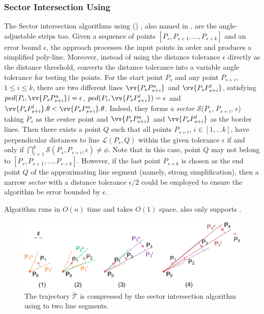 \subsubsection {Sector Intersection Using \ped}
\label{sec-siped}

The Sector intersection algorithms using \ped (\siped) \cite{Williams:Longest,Sklansky:Cone,Dunham:Cone}, also named \sleeve in \cite{Zhao:Sleeve}, are {the angle-adjustable strips too}.
Given a sequence of points $[P_{s}, P_{s+1}, \ldots, P_{s+k}]$ and an error bound $\epsilon$, the \siped approach processes the input points in order and produces a simplified poly-line.  Moreover, instead of using the distance tolerance $\epsilon$ directly as the distance threshold, \siped converts the distance tolerance into a variable angle tolerance for testing the points.
%
For the start point $P_s$ and any point $P_{s+i}$, $1\le i\le k$, there are two different lines $\vv{P_sP^u_{s+i}}$ and $\vv{P_sP^l_{s+i}}$, satisfying $ped(P_i, \vv{P_sP^u_{s+i}}) = \epsilon$, $ped(P_i, \vv{P_sP^l_{s+i}}) = \epsilon$ and $\vv{P_sP^l_{s+i}}.\theta < \vv{P_sP^u_{s+i}}.\theta$. Indeed, they forms a \emph{sector} $\mathcal{S}$($P_s$, $P_{s+i}$, $\epsilon$) taking $P_s$ as the center point and $\vv{P_sP^u_{s+i}}$ and $\vv{P_sP^l_{s+i}}$ as the border lines.
Then there exists a point $Q$ such that all points $P_{s+i}$, $i \in [1, ... k]$, have perpendicular distances to
line $\mathcal{L}(P_s,Q)$ within the given \ped tolerance $\epsilon$ if and only if $\bigcap_{i=1}^{k}\mathcal{S}(P_s, P_{s+i}, \epsilon) \ne \phi$.
Note that in this case, point $Q$ may not belong to $[P_{s}, P_{s+1}, \ldots, P_{s+k}]$.
However, if the last point $P_{s+k}$ is chosen as the end point $Q$ of the approximating line segment (namely, strong simplification), then a narrow \emph{sector} with a distance tolerance $\epsilon/2$ could be employed to ensure the algorithm be \ped error bounded by $\epsilon$\cite{Zhao:Sleeve}.

Algorithm \siped runs in $O(n)$ time and takes $O(1)$ space.
\siped also only supports \ped.


\begin{figure}[tb!]
	\centering
	\includegraphics[scale=0.66]{figures/Fig-sleeve.png}
	\vspace{-3ex}
	\caption{\small The trajectory $\dddot{\mathcal{T}}$ is compressed by the sector intersection algorithm using \ped to two line segments.}
	\vspace{-2ex}
	\label{fig:sleeve}
\end{figure}


